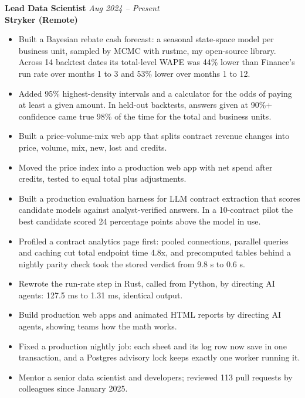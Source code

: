 \documentclass[10pt]{article}
\begin{document}
\textbf{Lead Data Scientist} \hfill \textit{Aug 2024 -- Present}\\
\textbf{Stryker (Remote)}
\begin{itemize}[leftmargin=0.2in]
    \item Built a Bayesian rebate cash forecast: a seasonal state-space model per business unit, sampled by MCMC with rustmc, my open-source library. Across 14 backtest dates its total-level WAPE was 44\% lower than Finance's run rate over months 1 to 3 and 53\% lower over months 1 to 12.
    \item Added 95\% highest-density intervals and a calculator for the odds of paying at least a given amount. In held-out backtests, answers given at 90\%+ confidence came true 98\% of the time for the total and business units.
    \item Built a price-volume-mix web app that splits contract revenue changes into price, volume, mix, new, lost and credits.
    \item Moved the price index into a production web app with net spend after credits, tested to equal total plus adjustments.
    \item Built a production evaluation harness for LLM contract extraction that scores candidate models against analyst-verified answers. In a 10-contract pilot the best candidate scored 24 percentage points above the model in use.
    \item Profiled a contract analytics page first: pooled connections, parallel queries and caching cut total endpoint time 4.8x, and precomputed tables behind a nightly parity check took the stored verdict from 9.8 s to 0.6 s.
    \item Rewrote the run-rate step in Rust, called from Python, by directing AI agents: 127.5 ms to 1.31 ms, identical output.
    \item Build production web apps and animated HTML reports by directing AI agents, showing teams how the math works.
    \item Fixed a production nightly job: each sheet and its log row now save in one transaction, and a Postgres advisory lock keeps exactly one worker running it.
    \item Mentor a senior data scientist and developers; reviewed 113 pull requests by colleagues since January 2025.
\end{itemize}
\end{document}
